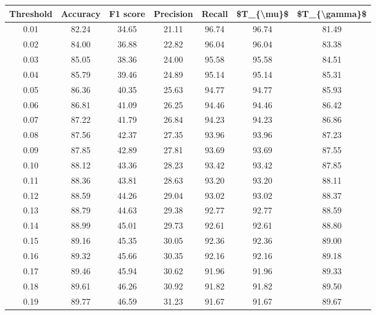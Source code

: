 \begin{tabular}{|c|c|c|c|c|c|c|}
\hline
 Threshold &  Accuracy &  F1 score &  Precision &  Recall &  \$T\_\{\textbackslash mu\}\$ &  \$T\_\{\textbackslash gamma\}\$ \\
\hline
      0.01 &     82.24 &     34.65 &      21.11 &   96.74 &      96.74 &         81.49 \\
      0.02 &     84.00 &     36.88 &      22.82 &   96.04 &      96.04 &         83.38 \\
      0.03 &     85.05 &     38.36 &      24.00 &   95.58 &      95.58 &         84.51 \\
      0.04 &     85.79 &     39.46 &      24.89 &   95.14 &      95.14 &         85.31 \\
      0.05 &     86.36 &     40.35 &      25.63 &   94.77 &      94.77 &         85.93 \\
      0.06 &     86.81 &     41.09 &      26.25 &   94.46 &      94.46 &         86.42 \\
      0.07 &     87.22 &     41.79 &      26.84 &   94.23 &      94.23 &         86.86 \\
      0.08 &     87.56 &     42.37 &      27.35 &   93.96 &      93.96 &         87.23 \\
      0.09 &     87.85 &     42.89 &      27.81 &   93.69 &      93.69 &         87.55 \\
      0.10 &     88.12 &     43.36 &      28.23 &   93.42 &      93.42 &         87.85 \\
      0.11 &     88.36 &     43.81 &      28.63 &   93.20 &      93.20 &         88.11 \\
      0.12 &     88.59 &     44.26 &      29.04 &   93.02 &      93.02 &         88.37 \\
      0.13 &     88.79 &     44.63 &      29.38 &   92.77 &      92.77 &         88.59 \\
      0.14 &     88.99 &     45.01 &      29.73 &   92.61 &      92.61 &         88.80 \\
      0.15 &     89.16 &     45.35 &      30.05 &   92.36 &      92.36 &         89.00 \\
      0.16 &     89.32 &     45.66 &      30.35 &   92.16 &      92.16 &         89.18 \\
      0.17 &     89.46 &     45.94 &      30.62 &   91.96 &      91.96 &         89.33 \\
      0.18 &     89.61 &     46.26 &      30.92 &   91.82 &      91.82 &         89.50 \\
      0.19 &     89.77 &     46.59 &      31.23 &   91.67 &      91.67 &         89.67 \\

\end{tabular}
